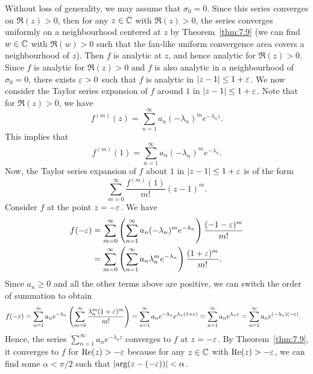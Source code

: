 \begin{pf}
    Without loss of generality, we may assume that $\sigma_0 = 0$. Since this 
    series converges on $\Re(z) > 0$, then for any $z \in \mathbb{C}$ with $\Re(z) > 0$, 
    the series converges uniformly on a neighbourhood centered at $z$ by 
    Theorem~\ref{thm:7.9} (we can find $w \in \mathbb{C}$ with $\Re(w) > 0$ such that 
    the fan-like uniform convergence area covers a neighbourhood of $z$). Then $f$ 
    is analytic at $z$, and hence analytic for $\Re(z) > 0$. Since $f$ is 
    analytic for $\Re(z) > 0$ and $f$ is also analytic in a neighbourhood of 
    $\sigma_0 = 0$, there exists $\varepsilon > 0$ such that $f$ is analytic in 
    $|z - 1| \leq 1 + \varepsilon$. We now consider the Taylor series expansion of $f$ 
    around $1$ in $|z - 1| \leq 1 + \varepsilon$. Note that for $\Re(z) > 0$, we have 
    \[ f^{(m)}(z) = \sum_{n=1}^\infty a_n(-\lambda_n)^m e^{-\lambda_n z}. \] 
    This implies that 
    \[ f^{(m)}(1) = \sum_{n=1}^\infty a_n(-\lambda_n)^m e^{-\lambda_n}. \]
    Now, the Taylor series expansion of $f$ about $1$ in $|z - 1| \leq 1 + \varepsilon$ 
    is of the form 
    \[ \sum_{m=0}^\infty \frac{f^{(m)}(1)}{m!} (z-1)^m. \] 
    Consider $f$ at the point $z = -\varepsilon$. We have 
    \begin{align*} 
        f(-\varepsilon) &= \sum_{m=0}^\infty \left( \sum_{n=1}^\infty a_n (-\lambda_n)^m 
        e^{-\lambda_n} \right) \frac{(-1-\varepsilon)^m}{m!} \\
        &= \sum_{m=0}^\infty \left( \sum_{n=1}^\infty a_n \lambda_n^m 
        e^{-\lambda_n} \right) \frac{(1+\varepsilon)^m}{m!}. 
    \end{align*}
    Since $a_n \geq 0$ and all the other terms above are positive, we can 
    switch the order of summation to obtain 
    \begin{align*}
        f(-\varepsilon) &= \sum_{n=1}^\infty a_n e^{-\lambda_n} \left( \sum_{m=0}^\infty 
        \frac{\lambda_n^m (1+\varepsilon)^m}{m!} \right) 
        = \sum_{n=1}^\infty a_n e^{-\lambda_n} e^{\lambda_n(1+\varepsilon)} 
        = \sum_{n=1}^\infty a_n e^{\lambda_n \varepsilon} 
        = \sum_{n=1}^\infty a_n e^{(-\lambda_n)(-\varepsilon)}.
    \end{align*}
    Hence, the series $\sum_{n=1}^\infty a_n e^{-\lambda_n z}$ converges 
    to $f$ at $z = -\varepsilon$. By Theorem~\ref{thm:7.9}, it converges to $f$ 
    for ${\rm Re}(z) > -\varepsilon$ because for any $z \in \mathbb{C}$ with ${\rm Re}(z) > -\varepsilon$, 
    we can find some $\alpha < \pi/2$ such that $\lvert\arg(z-(-\varepsilon))\rvert 
    < \alpha$. 
\end{pf}

